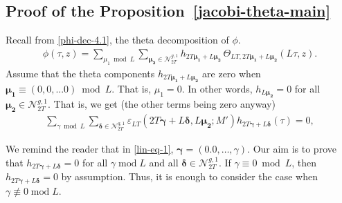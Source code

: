\documentclass[11pt]{amsart}
\numberwithin{equation}{section}
\newcommand{\mc}{\mathcal}
\renewcommand*{\mod}{\operatorname{mod}}
\newcommand{\z}{\mathbb{Z}}
\begin{document}
\subsection{Proof of the Proposition~\ref{jacobi-theta-main}}\label{sec:thetamain}
Recall from \eqref{phi-dec-4.1}, the theta decomposition of $\phi$.
\begin{align}
    \phi(\tau, z)=\sum_{\mu_1\bmod L}\sum_{\bm{\mu_2}\in\mc N_{2T}^{g,1}}h_{2T\bm{\mu_1}+L\bm{\mu_2}} \, \Theta_{LT, 2T\bm{\mu_1}+L\bm{\mu_2}}(L\tau, z).
\end{align}
Assume that the theta components $h_{2T\bm{\mu_1}+L\bm{\mu_2}}$ are zero when $\bm{\mu_1}\equiv (0,0,...0)\bmod L$. That is, $\mu_1=0$. In other words, $h_{L\bm{\mu_2}}=0$ for all $\bm{\mu_2}\in \mc N_{2T}^{g,1}$. That is, we get (the other terms being zero anyway)
\begin{align}\label{lin-eq-1}
\sum_{\gamma\bmod L}\sum_{\bm{\delta}\in\mc N_{2T}^{g,1}}\varepsilon_{LT}(2T{\bm{ \gamma}}+L\bm\delta, L\bm{\mu_2};  M') h_{2T{\bm{ \gamma}}+L\bm{\delta}}(\tau)=0,
\end{align} 

 We remind the reader that in \eqref{lin-eq-1}, $\bm \gamma=(0.0,\ldots, \gamma)$.
Our aim is to prove that $h_{2T{\bm{ \gamma}}+L\bm{\delta}}=0$ for all $\gamma\mod L$ and all $\bm{\delta}\in \mc N_{2T}^{g,1}$. If $\gamma\equiv 0\bmod L$, then $h_{2T{\bm{ \gamma}}+L\bm{\delta}}=0$ by assumption. Thus, it is enough to consider the case when $\gamma\not \equiv 0 \mod L$.
\end{document}
